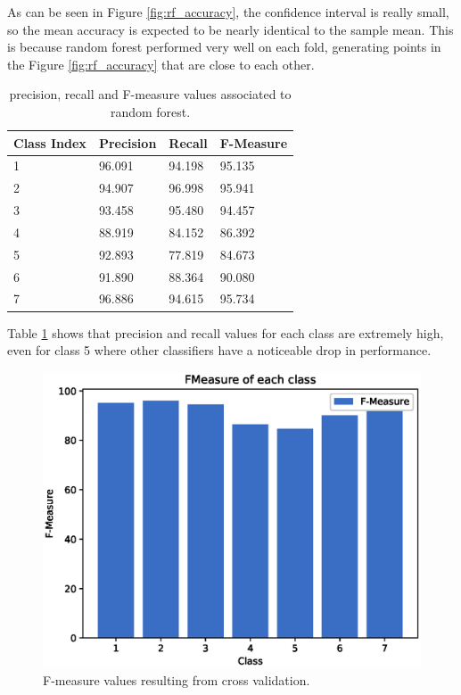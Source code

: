 \documentclass[a4paper, 10pt]{article}
\begin{document}
As can be seen in Figure \ref{fig:rf_accuracy}, the confidence interval is really small, so the mean accuracy is expected to be nearly identical to the sample mean. This is because random forest performed very well on each fold, generating points in the Figure \ref{fig:rf_accuracy} that are close to each other.
\begin{table}[H]
\centering
\begin{tabular}{|l|l|l|l|}
\hline
\textbf{Class Index} & \textbf{Precision} & \textbf{Recall} & \textbf{F-Measure}\\\hline
1 & 96.091 & 94.198& 95.135\\\hline
2 & 94.907 & 96.998& 95.941\\\hline
3 & 93.458 & 95.480& 94.457\\\hline
4 & 88.919 & 84.152& 86.392\\\hline
5 & 92.893 & 77.819& 84.673\\\hline
6 & 91.890 & 88.364& 90.080\\\hline
7 & 96.886 & 94.615& 95.734\\\hline
\end{tabular}
 \caption{precision, recall and F-measure values associated to random forest.}
 \label{tab:rf_pr}
\end{table}

Table \ref{tab:rf_pr} shows that precision and recall values for each class are extremely high, even for class 5 where other classifiers have a noticeable drop in performance.
\begin{figure}[H]
 \centering
 \includegraphics[width=0.8\linewidth]{pictures/random_forest_fmeasure.eps}
 \caption{F-measure values resulting from cross validation.}
 \label{fig:rf_fmeasure}
\end{figure}
\end{document}
